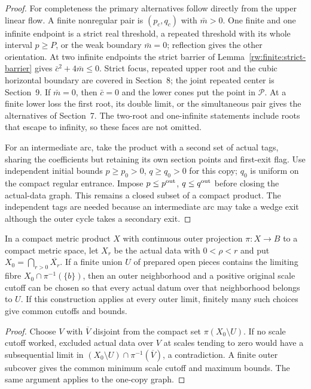 \begin{proof}
For completeness the primary alternatives follow directly from
the upper linear flow. A finite nonregular pair is $(p_c,q_c)$
with $\bar m>0$. One finite and one infinite endpoint is a
strict real threshold, a repeated threshold with its whole interval
$p\ge P$, or the weak boundary $\bar m=0$; reflection gives
the other orientation. At two infinite endpoints the strict barrier
of Lemma~\ref{rw:finite:strict-barrier} gives
$\bar c^2+4\bar m\le0$. Strict focus, repeated upper root and
the cubic horizontal boundary are covered in Section~8; the joint
repeated center is Section~9. If $\bar m=0$, then $\bar c=0$
and the lower cones put the point in $\mathcal P$.
At a finite lower loss the first root, its double limit, or the
simultaneous pair gives the alternatives of Section~7.
The two-root and one-infinite statements include roots that escape
to infinity, so these faces are not omitted.

For an intermediate arc, take the product with a second set of actual
tags, sharing the coefficients but retaining its own section points
and first-exit flag.
Use independent initial bounds $p\ge p_0>0$, $q\ge q_0>0$ for
this copy; $q_0$ is uniform on the compact regular entrance.
Impose $p\le p^{\rm out}$, $q\le q^{\rm out}$ before
closing the actual-data graph. This remains a closed subset of a
compact product. The independent tags are needed because an
intermediate arc may take a wedge exit although the outer cycle takes
a secondary exit.
\end{proof}

\begin{lemma}
\label{rw:fibre:compact-selection}
In a compact metric product $X$ with continuous outer projection
$\pi:X\to B$ to a compact metric space, let
$X_r$ be the actual data with $0<\rho<r$ and put
$X_0=\bigcap_{r>0}\overline{X_r}$. If a finite union
$U$ of prepared open pieces contains the limiting fibre
$X_0\cap\pi^{-1}(\{b\})$, then
an outer neighborhood and a positive original scale cutoff can be
chosen so that every actual datum over that neighborhood belongs to
$U$. If this construction applies at every outer limit, finitely many
such choices give common cutoffs and bounds.
\end{lemma}
\begin{proof}
Choose $V$ with $\overline V$ disjoint from the compact set
$\pi(X_0\setminus U)$. If no scale cutoff worked, excluded actual data
over $V$ at scales tending to zero would have a subsequential limit in
$(X_0\setminus U)\cap\pi^{-1}(\overline V)$, a contradiction.
A finite outer subcover gives the common minimum scale cutoff and
maximum bounds. The same argument applies to the one-copy graph.
\end{proof}

